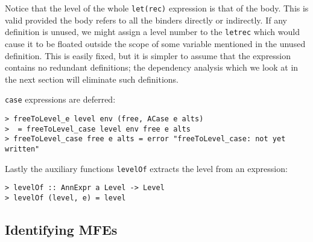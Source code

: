 %
Notice that the level of the whole \mbox{\tt let(rec)} expression is that of
the body.  This is valid provided the body refers to all the binders
directly or indirectly.  If any definition is unused, we might assign
a level number to the \mbox{\tt letrec} which would cause it to be floated
outside the scope of some variable mentioned in the unused definition.
This is easily fixed, but it is simpler to assume that the expression
contains no redundant definitions; the dependency analysis which we
look at in the next section will eliminate such definitions.

\mbox{\tt case} expressions are deferred:
\begin{verbatim}
> freeToLevel_e level env (free, ACase e alts)
>  = freeToLevel_case level env free e alts
> freeToLevel_case free e alts = error "freeToLevel_case: not yet written"
\end{verbatim}
\par
Lastly the auxiliary functions \mbox{\tt levelOf} extracts the level from an
expression:
\begin{verbatim}
> levelOf :: AnnExpr a Level -> Level
> levelOf (level, e) = level
\end{verbatim}
%
%
\subsection{Identifying MFEs}
\label{identifyMFEs}

